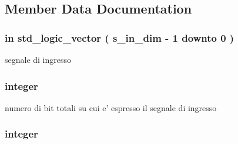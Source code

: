 \subsection{Member Data Documentation}
\hypertarget{classtruncate_a6d6bd3ddfff26c223f1752f25545e304}{
\subsubsection[{s\+\_\+in}]{ {\bfseries \textcolor{vhdlchar}{in}\textcolor{vhdlchar}{ }} {\bfseries \textcolor{vhdlchar}{std\+\_\+logic\+\_\+vector}\textcolor{vhdlchar}{ }\textcolor{vhdlchar}{(}\textcolor{vhdlchar}{ }\textcolor{vhdlchar}{ }\textcolor{vhdlchar}{ }\textcolor{vhdlchar}{ }{\bfseries {\bf s\+\_\+in\+\_\+dim}} \textcolor{vhdlchar}{-\/}\textcolor{vhdlchar}{ } \textcolor{vhdldigit}{1} \textcolor{vhdlchar}{ }\textcolor{vhdlchar}{downto}\textcolor{vhdlchar}{ }\textcolor{vhdlchar}{ } \textcolor{vhdldigit}{0} \textcolor{vhdlchar}{ }\textcolor{vhdlchar}{)}\textcolor{vhdlchar}{ }} \hspace{0.3cm}{\ttfamily [Port]}}}\label{classtruncate_a6d6bd3ddfff26c223f1752f25545e304}


segnale di ingresso 

\hypertarget{classtruncate_ad3d18243ad6fe53a2277e2aa9b94ca45}{
\subsubsection[{s\+\_\+in\+\_\+dim}]{ {\bfseries \textcolor{vhdlchar}{ }} {\bfseries \textcolor{vhdlchar}{integer}\textcolor{vhdlchar}{ }} \hspace{0.3cm}{\ttfamily [Generic]}}}\label{classtruncate_ad3d18243ad6fe53a2277e2aa9b94ca45}


numero di bit totali su cui e' espresso il segnale di ingresso 

\hypertarget{classtruncate_abe72b503b8140ab0d84911165e959b53}{
\subsubsection[{s\+\_\+in\+\_\+int}]{ {\bfseries \textcolor{vhdlchar}{ }} {\bfseries \textcolor{vhdlchar}{integer}\textcolor{vhdlchar}{ }} \hspace{0.3cm}{\ttfamily [Generic]}}}\label{classtruncate_abe72b503b8140ab0d84911165e959b53}


